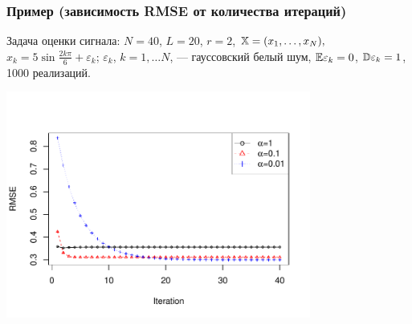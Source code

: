 \documentclass[unicode, notheorems]{beamer}
\begin{document}
\begin{frame}
	\frametitle{Пример (зависимость RMSE от количества итераций)}
	Задача оценки сигнала: $N = 40$, $L = 20$, $r = 2$, $\mathbb{X} = (x_{1}, \ldots, x_N),$  $x_k = 5\sin{\frac{2 k \pi}{6}} + \varepsilon_k$; $\varepsilon_k$, $k = 1, \ldots N$, --- гауссовский белый шум, $\mathbb{E} \varepsilon_k = 0$, $\mathbb{D} \varepsilon_k = 1$, 1000 реализаций.
	
	\vspace{-1cm}
	\begin{center}
		\includegraphics*[width = 10cm]{cadzowspeed_3.pdf}
	\end{center}
\end{frame}

%	

	
\end{document}
